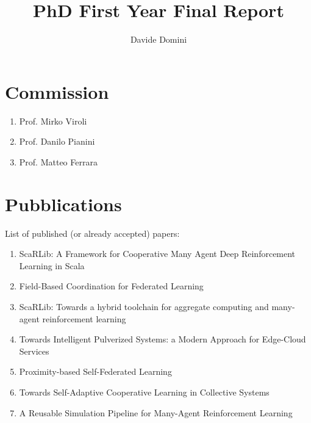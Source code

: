 \documentclass[runningheads]{llncs}
\begin{document}
%
\title{PhD First Year Final Report}
%
%
\author{Davide Domini}
%
%
%
\maketitle              %
%

%
%
%
\section{Commission}
\begin{enumerate}
    \item Prof. Mirko Viroli
    \item Prof. Danilo Pianini
    \item Prof. Matteo Ferrara
\end{enumerate}

\section{Pubblications}
List of published (or already accepted) papers:
\begin{enumerate}
    \item ScaRLib: A Framework for Cooperative Many Agent Deep Reinforcement Learning in Scala~\cite{DBLP:conf/coordination/DominiCAV23}
    \item Field-Based Coordination for Federated Learning~\cite{DBLP:conf/coordination/DominiAEV24}
    \item ScaRLib: Towards a hybrid toolchain for aggregate computing and many-agent reinforcement learning~\cite{DBLP:journals/scp/DominiCAV24}
    \item Towards Intelligent Pulverized Systems: a Modern Approach for Edge-Cloud Services~\cite{DBLP:conf/woa/DominiFAV24}
    \item Proximity-based Self-Federated Learning~\cite{DBLP:conf/acsos/DominiFAVE24}
    \item Towards Self-Adaptive Cooperative Learning in Collective Systems~\cite{DBLP:conf/acsos/Domini24}
    \item A Reusable Simulation Pipeline for Many-Agent Reinforcement Learning~\cite{DBLP:conf/dsrt/DominiAPV24}
\end{enumerate}
\end{document}

